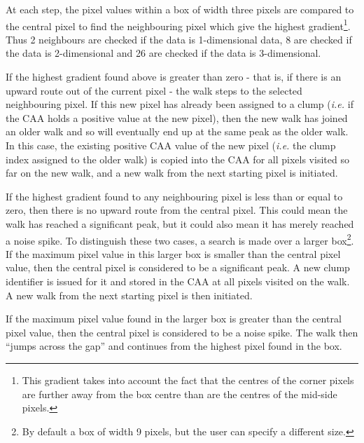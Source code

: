 \documentclass[final,authoryear,5p,times,twocolumn]{elsarticle}
\begin{document}
At each step, the pixel values within a box of width three pixels are compared
to the central pixel to find the neighbouring pixel which give the highest
gradient\footnote{This gradient takes into account the fact that the
centres of the corner pixels are further away from the box centre than
are the centres of the mid-side pixels.}. Thus 2 neighbours are checked if
the data is 1-dimensional data, 8 are checked if the data is 2-dimensional
and 26 are checked if the data is 3-dimensional.

If the highest gradient found above is greater than zero - that is, if
there is an upward route out of the current pixel - the walk steps to the
selected neighbouring pixel. If this new pixel has already been assigned
to a clump (\emph{i.e.} if the CAA holds a positive value at the new
pixel), then the new walk has joined an older walk and so will eventually
end up at the same peak as the older walk. In this case, the existing
positive CAA value of the new pixel (\emph{i.e.} the clump index assigned
to the older walk) is copied into the CAA for all pixels visited so far
on the new walk, and a new walk from the next starting pixel is
initiated.

If the highest gradient found to any neighbouring pixel is less than or
equal to zero, then there is no upward route from the central pixel. This
could mean the walk has reached a significant peak, but it could also
mean it has merely reached a noise spike. To distinguish these two cases,
a search is made over a larger box\footnote{By default a box of width 9
pixels, but the user can specify a different size.}. If the maximum pixel
value in this larger box is smaller than the central pixel value, then
the central pixel is considered to be a significant peak. A new clump
identifier is issued for it and stored in the CAA at all pixels visited
on the walk. A new walk from the next starting pixel is then initiated.

If the maximum pixel value found in the larger box is greater than the
central pixel value, then the central pixel is considered to be a noise
spike. The walk then ``jumps across the gap'' and continues from the
highest pixel found in the box.
\end{document}
